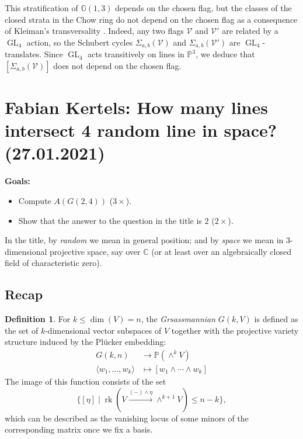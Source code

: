 \documentclass[12pt,a4paper]{amsart}
\theoremstyle{plain}
\theoremstyle{definition}
\newtheorem{defn}[thm]{Definition}
\theoremstyle{remark}
\begin{document}
This stratification of $\mathbb{G}(1,3)$ depends on the chosen flag, but the classes of the closed strata in the Chow ring do not depend on the chosen flag as a consequence of Kleiman's transversality \cite[Theorem 1.7]{eh16}.
Indeed, any two flags $\mathcal{V}$ and $\mathcal{V}'$ are related by a $\operatorname{GL}_{4}$ action, so the Schubert cycles $\Sigma_{a,b}(\mathcal{V})$ and $\Sigma_{a,b}(\mathcal{V}')$ are $\operatorname{GL}_{4}$-translates.
Since $\operatorname{GL}_{4}$ acts transitively on lines in $\mathbb{P}^{3}$, we deduce that $[\Sigma_{a,b}(\mathcal{V})]$ does not depend on the chosen flag.

\section{Fabian Kertels: How many lines intersect 4 random line in space? (27.01.2021)}

\textbf{Goals:}
\begin{itemize}
    \item Compute $A(G(2,4))$ ($3\times $).
    \item Show that the answer to the question in the title is $2$ ($2\times $).
\end{itemize}

In the title, by \textit{random} we mean in general position; and by \textit{space} we mean in $3$-dimensional projective space, say over $\mathbb{C}$ (or at least over an algebraically closed field of characteristic zero).

\subsection{Recap}

\begin{defn}
    For $k\leq \dim(V)=n$, the \textit{Grsassmannian} $G(k,V)$ is defined as the set of $k$-dimensional vector subspaces of $V$ together with the projective variety structure induced by the Pl\"{u}cker embedding:
    \begin{align*}
	G(k,n) & \longrightarrow \mathbb{P}(\wedge^{k} V) \\
	\langle w_{1},\ldots,w_{k}\rangle & \longmapsto [w_{1}\wedge \cdots \wedge w_{k}]
    \end{align*}
    The image of this function consists of the set
    \[ \{[\eta]\mid \operatorname{rk}(V\xrightarrow{(-)\wedge\eta}\wedge^{k+1}V)\leq n-k\}, \]
    which can be described as the vanishing locus of some minors of the corresponding matrix once we fix a basis.
\end{defn}
\end{document}
